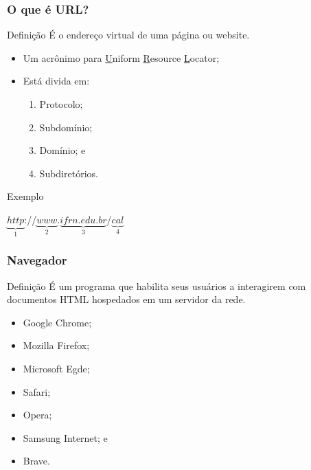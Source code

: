 \documentclass[aspectratio=169]{beamer} %
\begin{document}
\begin{frame}
	\frametitle{O que é URL?}
	
	\begin{block}{Defini\c cão}
		É o endereço virtual de uma página ou website.
	\end{block} \vfill
		
	\begin{itemize}
		\item Um acrônimo para \underline{U}niform \underline{R}esource \underline{L}ocator;
		\item Está divida em: 
			\begin{enumerate}
				\item Protocolo; 
				\item Subdomínio; 
				\item Domínio; e 
				\item Subdiretórios.
			\end{enumerate}				
	\end{itemize} \vfill
	
	\begin{exampleblock}{Exemplo}
		\begin{center}
			$\underbrace{http}_{1}$://$\underbrace{www}_{2}$.$\underbrace{ifrn.edu.br}_{3}$/$\underbrace{cal}_{4}$
		\end{center}
	\end{exampleblock}
\end{frame}

\begin{frame}
	\frametitle{Navegador}
	
	\begin{block}{Defini\c cão}
		É um programa que habilita seus usuários a interagirem com documentos HTML hospedados em um servidor da rede.
	\end{block} \vfill
		
	\begin{itemize}
		\item Google Chrome;
		\item Mozilla Firefox;
		\item Microsoft Egde;
		\item Safari;
		\item Opera;
		\item Samsung Internet; e
		\item Brave.
	\end{itemize}
\end{frame}
\end{document}

